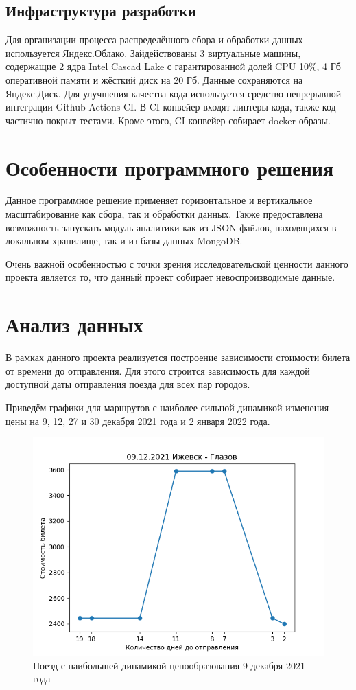\documentclass[conference]{IEEEtran}
\begin{document}
\subsection{Инфраструктура разработки}

Для организации процесса распределённого сбора и обработки данных используется Яндекс.Облако. Зайдействованы 3 виртуальные машины, содержащие 2 ядра Intel Cascad Lake с гарантированной долей CPU 10\%, 4 Гб оперативной памяти и жёсткий диск на 20 Гб. Данные сохраняются на Яндекс.Диск. Для улучшения качества кода используется средство непрерывной интеграции Github Actions CI. В CI-конвейер входят линтеры кода, также код частично покрыт тестами. Кроме этого, CI-конвейер собирает docker образы.

\section{Особенности программного решения}

Данное программное решение применяет горизонтальное и вертикальное масштабирование как сбора, так и обработки данных. Также предоставлена возможность запускать модуль аналитики как из JSON-файлов, находящихся в локальном хранилище, так и из базы данных MongoDB.

Очень важной особенностью с точки зрения исследовательской ценности данного проекта является то, что данный проект собирает невоспроизводимые данные.

\section{Анализ данных}

В рамках данного проекта реализуется построение зависимости стоимости билета от времени до отправления. Для этого строится зависимость для каждой доступной даты отправления поезда для всех пар городов.

Приведём графики для маршрутов с наиболее сильной динамикой изменения цены на 9, 12, 27 и 30 декабря 2021 года и 2 января 2022 года.

\begin{figure}[h!]
	\includegraphics[scale=0.5]{09122021}
	\caption{Поезд с наибольшей динамикой ценообразования 9 декабря 2021 года}
\end{figure}
\end{document}
